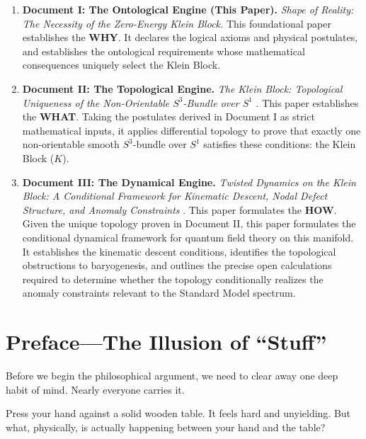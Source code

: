 \documentclass[11pt]{article}
\theoremstyle{canonstyle}
\providecommand{\Klein}{\mathcal{K}}
\def\mathcal#1{#1}%
\begin{document}
\begin{enumerate}
    \item \textbf{Document I: The Ontological Engine (This Paper).} \textit{Shape of Reality: The Necessity of the Zero-Energy Klein Block.} This foundational paper establishes the \textbf{WHY}. It declares the logical axioms and physical postulates, and establishes the ontological requirements whose mathematical consequences uniquely select the Klein Block.
    \item \textbf{Document II: The Topological Engine.} \textit{The Klein Block: Topological Uniqueness of the Non-Orientable $S^3$-Bundle over $S^1$} \cite{CanonWhat}. This paper establishes the \textbf{WHAT}. Taking the postulates derived in Document I as strict mathematical inputs, it applies differential topology to prove that exactly one non-orientable smooth $S^3$-bundle over $S^1$ satisfies these conditions: the Klein Block ($\Klein$).
    \item \textbf{Document III: The Dynamical Engine.} \textit{Twisted Dynamics on the Klein Block: A Conditional Framework for Kinematic Descent, Nodal Defect Structure, and Anomaly Constraints} \cite{CanonHow}. This paper formulates the \textbf{HOW}. Given the unique topology proven in Document II, this paper formulates the conditional dynamical framework for quantum field theory on this manifold. It establishes the kinematic descent conditions, identifies the topological obstructions to baryogenesis, and outlines the precise open calculations required to determine whether the topology conditionally realizes the anomaly constraints relevant to the Standard Model spectrum.
\end{enumerate}

\newpage
{}
\tableofcontents

\newpage
{}
\setcounter{page}{1}

\section*{Preface---The Illusion of ``Stuff''}

Before we begin the philosophical argument, we need to clear away one deep habit of mind. Nearly everyone carries it.

\begin{reflect}
Press your hand against a solid wooden table. It feels hard and unyielding. But what, physically, is actually happening between your hand and the table?
\end{reflect}
\end{document}
